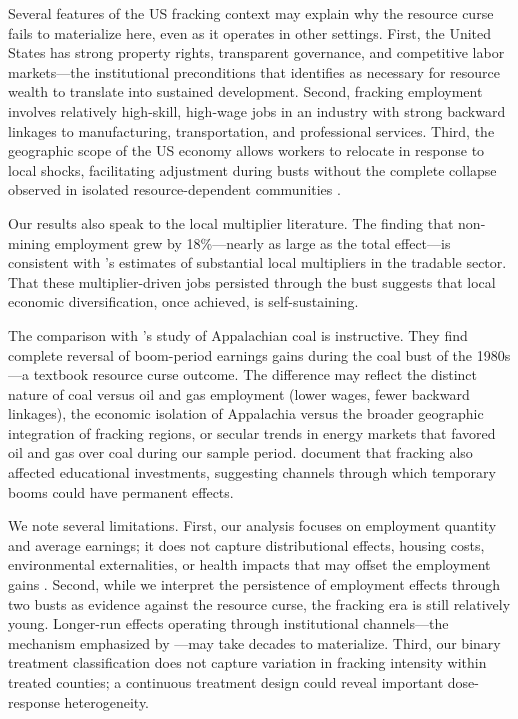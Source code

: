\documentclass[12pt]{article}
\begin{document}
Several features of the US fracking context may explain why the resource curse fails to materialize here, even as it operates in other settings. First, the United States has strong property rights, transparent governance, and competitive labor markets---the institutional preconditions that \citet{vanderploeg2011natural} identifies as necessary for resource wealth to translate into sustained development. Second, fracking employment involves relatively high-skill, high-wage jobs in an industry with strong backward linkages to manufacturing, transportation, and professional services. Third, the geographic scope of the US economy allows workers to relocate in response to local shocks, facilitating adjustment during busts without the complete collapse observed in isolated resource-dependent communities \citep{cust2015resource}.

Our results also speak to the local multiplier literature. The finding that non-mining employment grew by 18\%---nearly as large as the total effect---is consistent with \citet{moretti2010local}'s estimates of substantial local multipliers in the tradable sector. That these multiplier-driven jobs persisted through the bust suggests that local economic diversification, once achieved, is self-sustaining.

The comparison with \citet{black2005boom}'s study of Appalachian coal is instructive. They find complete reversal of boom-period earnings gains during the coal bust of the 1980s---a textbook resource curse outcome. The difference may reflect the distinct nature of coal versus oil and gas employment (lower wages, fewer backward linkages), the economic isolation of Appalachia versus the broader geographic integration of fracking regions, or secular trends in energy markets that favored oil and gas over coal during our sample period. \citet{cascio2022fracking} document that fracking also affected educational investments, suggesting channels through which temporary booms could have permanent effects.

We note several limitations. First, our analysis focuses on employment quantity and average earnings; it does not capture distributional effects, housing costs, environmental externalities, or health impacts that may offset the employment gains \citep{bartik2019externalities}. Second, while we interpret the persistence of employment effects through two busts as evidence against the resource curse, the fracking era is still relatively young. Longer-run effects operating through institutional channels---the mechanism emphasized by \citet{sachs2001curse}---may take decades to materialize. Third, our binary treatment classification does not capture variation in fracking intensity within treated counties; a continuous treatment design could reveal important dose-response heterogeneity.
\end{document}
